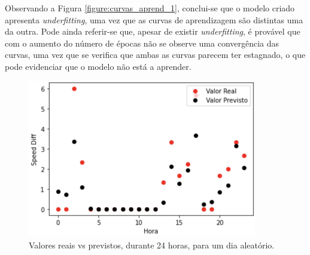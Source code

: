 \documentclass[a4paper, 12pt]{article}
\begin{document}
Observando a Figura \ref{figure:curvas_aprend_1}, conclui-se que o modelo criado apresenta \textit{underfitting}, uma vez que as curvas de aprendizagem são distintas uma da outra. Pode ainda referir-se que, apesar de existir \textit{underfitting}, é provável que com o aumento do número de épocas não se observe uma convergência das curvas, uma vez que se verifica que ambas as curvas parecem ter estagnado, o que pode evidenciar que o modelo não está a aprender.

\begin{figure}[H]
	\centering
	\includegraphics[width=10cm]{resultados/real_prev_1.png}
	\caption{Valores reais vs previstos, durante 24 horas, para um dia aleatório.}
	\label{figure:real_prev_1}
\end{figure}
\end{document}

